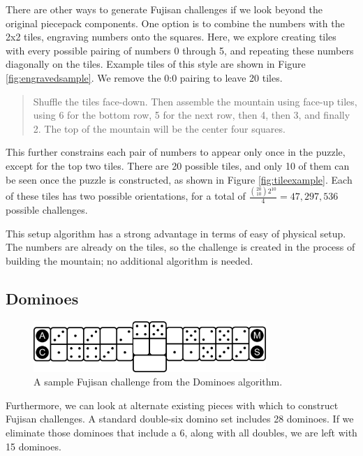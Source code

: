 \documentclass[10pt,journal,compsoc]{IEEEtran}
\begin{document}
There are other ways to generate Fujisan challenges if we look beyond the original piecepack components. One option is to combine the numbers with the 2x2 tiles, engraving
numbers onto the squares. Here, we explore creating tiles with every possible pairing of numbers 0 through 5, and repeating these numbers diagonally on the tiles. Example tiles of this style are shown in Figure \ref{fig:engravedsample}. We remove the 0:0 pairing to leave 20 tiles. 

\begin{quote}
    
  Shuffle the tiles face-down. Then assemble the mountain using face-up tiles, using 6 for the bottom row, 5 for the next row, then 4, then 3, and finally 2. The top of the mountain will be the center four squares.
\end{quote}

This further constrains each pair of numbers to appear only once in the puzzle, except for the top two tiles. There are 20 possible tiles, and only 10 of them can be seen once the puzzle is constructed, as shown in Figure \ref{fig:tileexample}. Each of these tiles has two possible orientations, for a total of $\frac{{20 \choose 10}2^{10}}{4} = 47,297,536$ possible challenges. 

This setup algorithm has a strong advantage in terms of easy of physical setup. The numbers are already on the tiles, so the challenge is created in the process of building the mountain; no additional algorithm is needed. 

\subsection{Dominoes}
\begin{figure}[b]
\includegraphics[width=8.8cm]{graphics/dominoexample.png}
\caption{A sample Fujisan challenge from the Dominoes algorithm.}
\label{fig:dominoexample}
\end{figure}

Furthermore, we can look at alternate existing pieces with which to construct Fujisan challenges. A standard double-six domino set includes 28 dominoes. If we eliminate those dominoes that include a 6, along with all doubles, we are left with 15 dominoes. 
\end{document}
